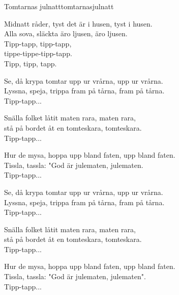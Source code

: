 \begin{song}{Tomtarnas julnatt}{tomtarnasjulnatt}
\begin{vers}
Midnatt råder, tyst det är i husen, tyst i husen.\\
Alla sova, släckta äro ljusen, äro ljusen.\\
Tipp-tapp, tipp-tapp,\\
tippe-tippe-tipp-tapp.\\
Tipp, tipp, tapp.\\
\end{vers}
\begin{vers}
Se, då krypa tomtar upp ur vrårna, upp ur vrårna.\\
Lyssna, speja, trippa fram på tårna, fram på tårna.\\
Tipp-tapp...\\
\end{vers}
\begin{vers}
Snälla folket låtit maten rara, maten rara,\\
stå på bordet åt en tomteskara, tomteskara.\\
Tipp-tapp...\\
\end{vers}
\begin{vers}
Hur de mysa, hoppa upp bland faten, upp bland faten.\\
Tissla, tassla: "God är julematen, julematen.\\
Tipp-tapp...\\
\end{vers}
\begin{vers}
Se, då krypa tomtar upp ur vrårna, upp ur vrårna.\\
Lyssna, speja, trippa fram på tårna, fram på tårna.\\
Tipp-tapp...\\
\end{vers}
\begin{vers}
Snälla folket låtit maten rara, maten rara,\\
stå på bordet åt en tomteskara, tomteskara.\\
Tipp-tapp...\\
\end{vers}
\newp
\begin{vers}
Hur de mysa, hoppa upp bland faten, upp bland faten.\\
Tissla, tassla: "God är julematen, julematen".\\
Tipp-tapp...\\
\end{vers}

\end{song}
